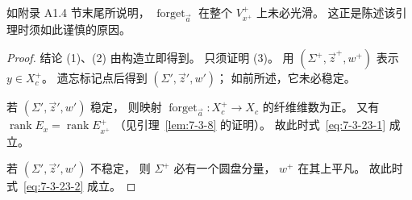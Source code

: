如附录 A1.4 节末尾所说明，
$\operatorname{forget}_{\vec a}$
在整个 $V_{x^+}^{+}$ 上未必光滑。
这正是陈述该引理时须如此谨慎的原因。

\begin{proof}
结论 (1)、(2) 由构造立即得到。
只须证明 (3)。
用 $(\Sigma^+,\vec z^+,w^+)$
表示 $y\in X_c^+$。
遗忘标记点后得到
$(\Sigma',\vec z',w')$；
如前所述，它未必稳定。

若 $(\Sigma',\vec z',w')$ 稳定，
则映射
$\operatorname{forget}_{\vec a}\colon
X_c^+\to X_c$
的纤维维数为正。
又有
$\operatorname{rank}E_x
=\operatorname{rank}E_{x^+}^{+}$
（见引理~\ref{lem:7-3-8} 的证明）。
故此时式~\eqref{eq:7-3-23-1} 成立。

若 $(\Sigma',\vec z',w')$ 不稳定，
则 $\Sigma^+$ 必有一个圆盘分量，
$w^+$ 在其上平凡。
故此时式~\eqref{eq:7-3-23-2} 成立。
\end{proof}

